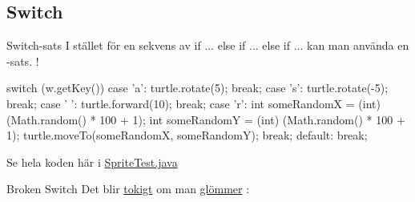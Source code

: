 \documentclass{lecturenotes}
\begin{document}

\subsection{Switch}
\begin{Slide}{Switch-sats}
I stället för en sekvens av if ... else if ... else if ... kan man använda en -sats.  !
\begin{Code}[basicstyle=\ttfamily\fontsize{7}{8}\selectfont]
    switch (w.getKey()) {
    case 'a':
        turtle.rotate(5);
        break;
    case 's':
        turtle.rotate(-5);
        break;
    case ' ':
        turtle.forward(10);
        break;
    case 'r':
        int someRandomX = (int) (Math.random() * 100 + 1);
        int someRandomY = (int) (Math.random() * 100 + 1);
        turtle.moveTo(someRandomX, someRandomY);
        break;
    default:
        break;
    }
\end{Code}
Se hela koden här i \href{https://github.com/bjornregnell/lth-eda016-2015/blob/master/lectures/examples/eclipse-ws/cs_pt/src/se/lth/cs/pt/window/SpriteTest.java}{SpriteTest.java}
\end{Slide} 
            
\begin{Slide}{Broken Switch}
Det blir \href{https://github.com/bjornregnell/lth-eda016-2015/blob/master/lectures/examples/eclipse-ws/lecture-examples/src/week05/BrokenSwitch.java}{tokigt} om man \href{http://stackoverflow.com/questions/2710300/why-do-we-need-break-after-case-statements}{glömmer} :

\end{Slide}            
\end{document}
